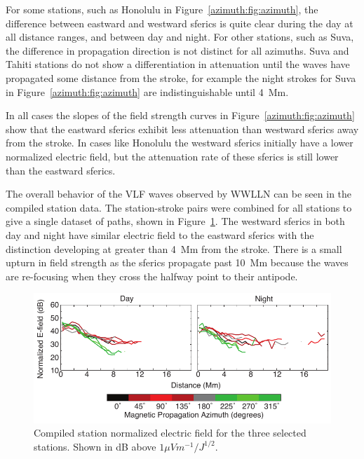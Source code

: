 For some stations, such as Honolulu in Figure~\ref{azimuth:fig:azimuth}, the difference between eastward and westward sferics is quite clear during the day at all distance ranges, and between day and night.
For other stations, such as Suva, the difference in propagation direction is not distinct for all azimuths.
Suva and Tahiti stations do not show a differentiation in attenuation until the waves have propagated some distance from the stroke, for example the night strokes for Suva in Figure~\ref{azimuth:fig:azimuth} are indistinguishable until 4~Mm.

In all cases the slopes of the field strength curves in Figure~\ref{azimuth:fig:azimuth} show that the eastward sferics exhibit less attenuation than westward sferics away from the stroke.
In cases like Honolulu the westward sferics initially have a lower normalized electric field, but the attenuation rate of these sferics is still lower than the eastward sferics.
  
The overall behavior of the VLF waves observed by WWLLN can be seen in the compiled station data.
The station-stroke pairs were combined for all stations to give a single dataset of paths, shown in Figure~\ref{azimuth:fig:azimuthAverage}.
The westward sferics in both day and night have similar electric field to the eastward sferics with the distinction developing at greater than 4~Mm from the stroke.
There is a small upturn in field strength as the sferics propagate past 10~Mm because the waves are re-focusing when they cross the halfway point to their antipode.

\begin{figure}[h!t]
    \centering
    \includegraphics[scale=1]{Azimuth/Figures/azimuthAverage.pdf} 
    \caption{Compiled station normalized electric field for the three selected stations.
    	Shown in dB above $1 \mu Vm^{-1}/J^{1/2}$.}
    \label{azimuth:fig:azimuthAverage}
 \end{figure}

